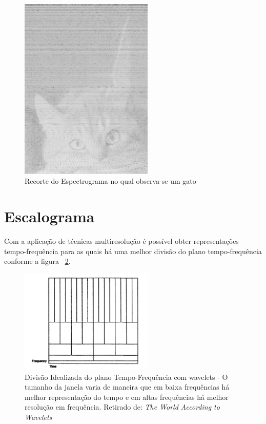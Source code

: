 \documentclass{article}
\begin{document}
\begin{figure}[H]
	\begin{center}
		\includegraphics[width=2.5in]{Figures/crop_cats.png}
		\caption{Recorte do Espectrograma no qual observa-se um gato}
		\label{fig:cats2}
	\end{center}
\end{figure}  

\section{Escalograma}
Com a aplicação de técnicas multiresolução é possível obter representações tempo-frequência para as quais há uma melhor divisão do plano tempo-frequência conforme a figura ~\ref{fig:tf}.
\begin{figure}[H]
	\begin{center}
		\includegraphics[width=2.5in]{Figures/tf_plane.png}
		\caption{Divisão Idealizada do plano Tempo-Frequência com wavelets - O tamanho da janela varia de maneira que em baixa frequências há melhor representação do tempo e em altas frequências há melhor resolução em frequência. Retirado de: \textit{The World According to Wavelets}}
		\label{fig:tf}
	\end{center}
\end{figure}
\end{document}

